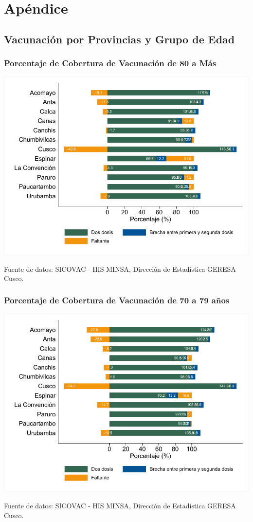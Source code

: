 \documentclass[xcolor=table]{beamer}
\begin{document}
\appendix
\section{Apéndice}

\subsection{Vacunación por Provincias y Grupo de Edad}

\begin{frame}[label=vacunas_90]
	\frametitle{Porcentaje de Cobertura de Vacunación de 80 a Más}
	\vspace{-.5cm}
	\begin{center}
		\includegraphics[width=0.8\linewidth, trim={.2cm .5cm .2cm .2cm},clip]{../figuras/vacunacion_provincial_edad_9.pdf}
	\end{center}
	{\tiny Fuente de datos: SICOVAC - HIS MINSA, Dirección de Estadística GERESA Cusco. \\}
	\hyperlink{cobertura_vacuna_provincias}{}
\end{frame}

\begin{frame}[label=vacunas_80]
	\frametitle{Porcentaje de Cobertura de Vacunación de 70 a 79 años}
	\vspace{-.5cm}
	\begin{center}
		\includegraphics[width=0.8\linewidth, trim={.2cm .5cm .2cm .2cm},clip]{../figuras/vacunacion_provincial_edad_8.pdf}
	\end{center}
	{\tiny Fuente de datos: SICOVAC - HIS MINSA, Dirección de Estadística GERESA Cusco. \\}
	\hyperlink{cobertura_vacuna_provincias}{}
\end{frame}
\end{document}
